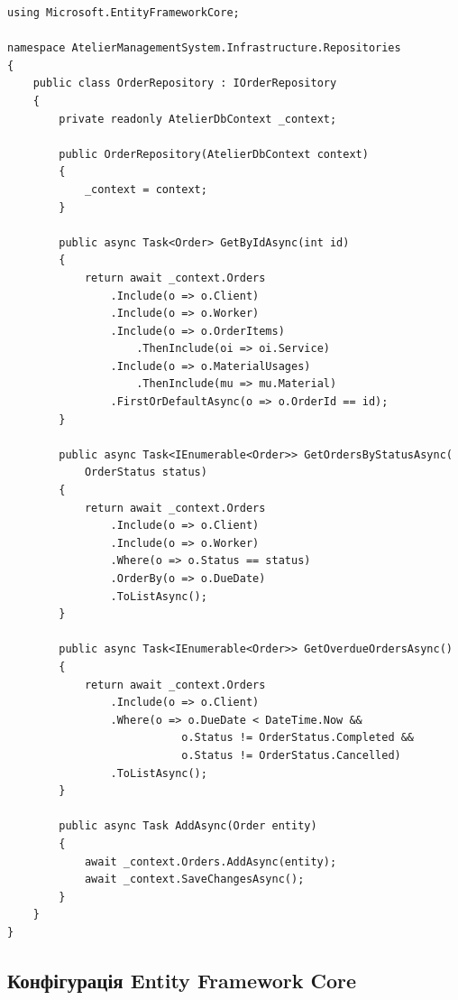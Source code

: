 \documentclass[14pt,a4paper]{extarticle}
\begin{document}
\begin{lstlisting}[language={[Sharp]C}, caption=Реалізація репозиторію замовлень, basicstyle=\small\ttfamily, breaklines=true, frame=single]
using Microsoft.EntityFrameworkCore;

namespace AtelierManagementSystem.Infrastructure.Repositories
{
    public class OrderRepository : IOrderRepository
    {
        private readonly AtelierDbContext _context;
        
        public OrderRepository(AtelierDbContext context)
        {
            _context = context;
        }
        
        public async Task<Order> GetByIdAsync(int id)
        {
            return await _context.Orders
                .Include(o => o.Client)
                .Include(o => o.Worker)
                .Include(o => o.OrderItems)
                    .ThenInclude(oi => oi.Service)
                .Include(o => o.MaterialUsages)
                    .ThenInclude(mu => mu.Material)
                .FirstOrDefaultAsync(o => o.OrderId == id);
        }
        
        public async Task<IEnumerable<Order>> GetOrdersByStatusAsync(
            OrderStatus status)
        {
            return await _context.Orders
                .Include(o => o.Client)
                .Include(o => o.Worker)
                .Where(o => o.Status == status)
                .OrderBy(o => o.DueDate)
                .ToListAsync();
        }
        
        public async Task<IEnumerable<Order>> GetOverdueOrdersAsync()
        {
            return await _context.Orders
                .Include(o => o.Client)
                .Where(o => o.DueDate < DateTime.Now && 
                           o.Status != OrderStatus.Completed &&
                           o.Status != OrderStatus.Cancelled)
                .ToListAsync();
        }
        
        public async Task AddAsync(Order entity)
        {
            await _context.Orders.AddAsync(entity);
            await _context.SaveChangesAsync();
        }
    }
}
\end{lstlisting}

\newpage
\subsection{Конфігурація Entity Framework Core}
\end{document}
